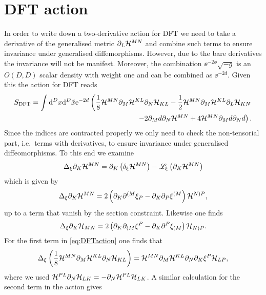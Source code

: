 \section{DFT action}
In order to write down a two-derivative action for DFT we need to take a derivative of the generalised metric $\partial_L\mathcal{H}^{MN}$ and combine such terms to ensure invariance under generalised diffemorphisms. However, due to the bare derivatives the invariance will not be manifest. Moreover, the combination $\ee^{-2\phi}\sqrt{-g}$ is an $O(D,D)$ scalar density with weight one and can be combined as $\ee^{-2d}$. Given this the action for DFT reads
\begin{equation}
\begin{aligned}\label{eq:DFTaction}
    S_{\text{DFT}} = \int \mathrm{d}^Dx\mathrm{d}^D\tilde{x} \mathrm{e}^{-2d}\left(\frac{1}{8}\mathcal{H}^{MN}\partial_M\mathcal{H}^{KL}\partial_N\mathcal{H}_{KL}-\frac{1}{2}\mathcal{H}^{MN}\partial_M\mathcal{H}^{KL}\partial_L\mathcal{H}_{KN}\right.\\
    \left. -2\partial_M d\partial_N\mathcal{H}^{MN}+4\mathcal{H}^{MN}\partial_M d\partial_N d\right).
\end{aligned}
\end{equation}
Since the indices are contracted properly we only need to check the non-tensorial part, i.e.\ terms with derivatives, to ensure invariance under generalised diffeomorphisms. To this end we examine
\begin{equation}
    \Delta_\xi \partial_K \mathcal{H}^{MN} = \partial_K\left(\delta_\xi\mathcal{H}^{MN}\right)-\mathscr{L}_\xi\left(\partial_K\mathcal{H}^{MN}\right)
\end{equation}
which is given by 
\begin{equation}
    \Delta_\xi \partial_K \mathcal{H}^{MN} = 2\left(\partial_K\partial^{(M}\xi_P-\partial_K\partial_P\xi^{(M}\right)\mathcal{H}^{N)P},
\end{equation}
up to a term that vanish by the section constraint. Likewise one finds 
\begin{equation}
    \Delta_\xi \partial_K\mathcal{H}_{MN} = 2\left(\partial_K\partial_{(M}\xi^P-\partial_K\partial^P\xi_{(M}\right)\mathcal{H}_{N)P}.
\end{equation}
For the first term in \eqref{eq:DFTaction} one finds that 
\begin{equation}\label{eq:dftvar1}
    \Delta_\xi\left(\frac{1}{8}\mathcal{H}^{MN}\partial_M\mathcal{H}^{KL}\partial_N\mathcal{H}_{KL}\right) = \mathcal{H}^{MN}\partial_M\mathcal{H}^{KL}\partial_N\partial_K\xi^P\mathcal{H}_{LP},
\end{equation}
where we used $\mathcal{H}^{PL}\partial_N\mathcal{H}_{LK}=-\partial_N\mathcal{H}^{PL}\mathcal{H}_{LK}$. A similar calculation for the second term in the action gives 

